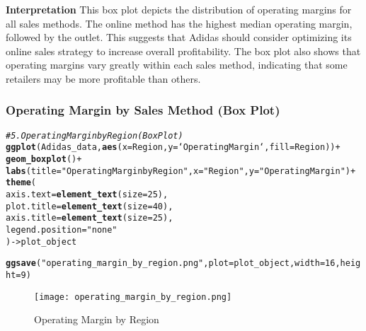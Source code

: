 \documentclass{article}\usepackage[]{graphicx}\usepackage[]{xcolor}
\makeatletter
\newcommand{\hlnum}[1]{\textcolor[rgb]{0.686,0.059,0.569}{#1}}%
\newcommand{\hlsng}[1]{\textcolor[rgb]{0.192,0.494,0.8}{#1}}%
\newcommand{\hlcom}[1]{\textcolor[rgb]{0.678,0.584,0.686}{\textit{#1}}}%
\newcommand{\hlopt}[1]{\textcolor[rgb]{0,0,0}{#1}}%
\newcommand{\hldef}[1]{\textcolor[rgb]{0.345,0.345,0.345}{#1}}%
\newcommand{\hlkwb}[1]{\textcolor[rgb]{0.69,0.353,0.396}{#1}}%
\newcommand{\hlkwc}[1]{\textcolor[rgb]{0.333,0.667,0.333}{#1}}%
\newcommand{\hlkwd}[1]{\textcolor[rgb]{0.737,0.353,0.396}{\textbf{#1}}}%
\newenvironment{kframe}{%
 \def\at@end@of@kframe{}%
 \ifinner\ifhmode%
  \def\at@end@of@kframe{\end{minipage}}%
  \begin{minipage}{\columnwidth}%
 \fi\fi%
 \def\FrameCommand##1{\hskip\@totalleftmargin \hskip-\fboxsep
 \colorbox{shadecolor}{##1}\hskip-\fboxsep
     \hskip-\linewidth \hskip-\@totalleftmargin \hskip\columnwidth}%
 \MakeFramed {\advance\hsize-\width
   \@totalleftmargin\z@ \linewidth\hsize
   \@setminipage}}%
 {\par\unskip\endMakeFramed%
 \at@end@of@kframe}
\newenvironment{knitrout}{}{} %
\makeatother
\begin{document}
\textbf{Interpretation} This box plot depicts the distribution of operating margins for all sales methods.  The online method has the highest median operating margin, followed by the outlet.  This suggests that Adidas should consider optimizing its online sales strategy to increase overall profitability.  The box plot also shows that operating margins vary greatly within each sales method, indicating that some retailers may be more profitable than others.

\subsubsection{Operating Margin by Sales Method (Box Plot)}

\begin{knitrout}
\color{fgcolor}\begin{kframe}
\begin{alltt}
\hlcom{# 5. Operating Margin by Region (Box Plot)}
\hlkwd{ggplot}\hldef{(Adidas_data,} \hlkwd{aes}\hldef{(}\hlkwc{x} \hldef{= Region,} \hlkwc{y} \hldef{= `Operating Margin`,} \hlkwc{fill} \hldef{= Region))} \hlopt{+}
  \hlkwd{geom_boxplot}\hldef{()} \hlopt{+}
  \hlkwd{labs}\hldef{(}\hlkwc{title} \hldef{=} \hlsng{"Operating Margin by Region"}\hldef{,} \hlkwc{x} \hldef{=} \hlsng{"Region"}\hldef{,} \hlkwc{y} \hldef{=} \hlsng{"Operating Margin"}\hldef{)} \hlopt{+}
  \hlkwd{theme}\hldef{(}
    \hlkwc{axis.text} \hldef{=} \hlkwd{element_text}\hldef{(}\hlkwc{size} \hldef{=} \hlnum{25}\hldef{),}
    \hlkwc{plot.title} \hldef{=} \hlkwd{element_text}\hldef{(}\hlkwc{size} \hldef{=} \hlnum{40}\hldef{),}
    \hlkwc{axis.title} \hldef{=} \hlkwd{element_text}\hldef{(}\hlkwc{size} \hldef{=} \hlnum{25}\hldef{),}
    \hlkwc{legend.position} \hldef{=} \hlsng{"none"}
  \hldef{)} \hlkwb{->} \hldef{plot_object}


\hlkwd{ggsave}\hldef{(}\hlsng{"operating_margin_by_region.png"}\hldef{,} \hlkwc{plot} \hldef{= plot_object,} \hlkwc{width} \hldef{=} \hlnum{16}\hldef{,} \hlkwc{height} \hldef{=} \hlnum{9}\hldef{)}
\end{alltt}
\end{kframe}
\end{knitrout}

\begin{figure}[htbp]
\centering
\texttt{[image: operating\_margin\_by\_region.png]}
\caption{Operating Margin by Region}
\label{fig:operating_margin_by_region}
\end{figure}
\end{document}
